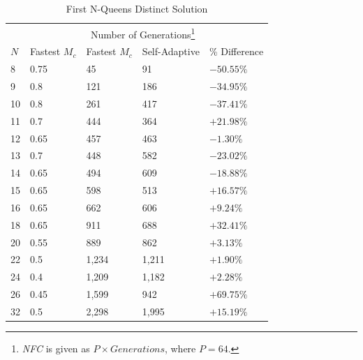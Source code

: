 \documentclass[conference]{IEEEtran}
\begin{document}
\begin{table}
\caption{First N-Queens Distinct Solution}
\begin{minipage}{\columnwidth}%
\centering
\renewcommand\footnoterule{ \kern -2ex}
\renewcommand{\thempfootnote}{\fnsymbol{mpfootnote}}
\begin{tabular}{|l|l|l|l|l|} \hline
&               &  \multicolumn{2}{c|}{Number of Generations\footnote{\emph{NFC} is given as $P \times Generations$, where $P = 64$.}}& \\ \cline{3-4}
$N$&    Fastest $M_{c}$&    Fastest $M_{c}$&   Self-Adaptive&    \% Difference\\ \hline
 8&     0.75&               45&                     91&                     $ -50.55\% $\\ \hline
 9&     0.8&                121&                    186&                    $ -34.95\% $\\ \hline
10&     0.8&                261&                    417&                    $ -37.41\% $\\ \hline
11&     0.7&                444&                    364&                    $ +21.98\% $\\ \hline
12&     0.65&               457&                    463&                    $ -1.30\%  $\\ \hline
13&     0.7&                448&                    582&                    $ -23.02\% $\\ \hline
14&     0.65&               494&                    609&                    $ -18.88\% $\\ \hline
15&     0.65&               598&                    513&                    $ +16.57\% $\\ \hline
16&     0.65&               662&                    606&                    $ +9.24\%  $\\ \hline
18&     0.65&               911&                    688&                    $ +32.41\% $\\ \hline
20&     0.55&               889&                    862&                    $ +3.13\%  $\\ \hline
22&     0.5&                1,234&                  1,211&                  $ +1.90\%  $\\ \hline
24&     0.4&                1,209&                  1,182&                  $ +2.28\%  $\\ \hline
26&     0.45&               1,599&                  942&                    $ +69.75\% $\\ \hline
32&     0.5&                2,298&                  1,995&                  $ +15.19\% $\\ \hline
\end{tabular}
\label{table:firstsol}
\end{minipage}
\end{table}
\end{document}
